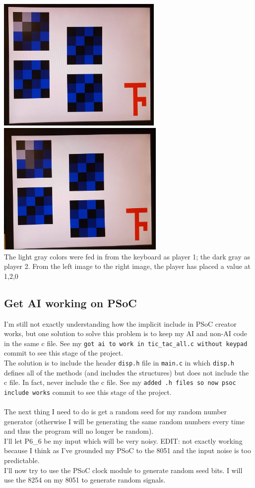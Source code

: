 \documentclass[12pt,twoside]{article}
\begin{document}
\begin{center}
\includegraphics[width = 80mm]{Pics/5-4b.jpg}
\includegraphics[width = 81mm]{Pics/5-4a.jpg}
\\ The light gray colors were fed in from the keyboard as player 1; the dark gray as player 2. From the left image to the right image, the player has placed a value at 1,2,0 \end{center}

\subsection{Get AI working on PSoC }
I'm still not exactly understanding how the implicit include in PSoC creator works, but one solution to solve this problem is to keep my AI and non-AI code in the same c file. See my \texttt{got ai to work in tic\_tac\_all.c without keypad} commit to see this stage of the project. 
\\ The solution is to include the header \texttt{disp.h} file in \texttt{main.c} in which \texttt{disp.h} defines all of the methods (and includes the structures) but does not include the c file. In fact, never include the c file.  See my \texttt{added .h files so now psoc include works} commit to see this stage of the project. 
\\
\\ The next thing I need to do is get a random seed for my random number generator (otherwise I will be generating the same random numbers every time and thus the program will no longer be random). 
\\ \indent I'll let P6\_6 be my input which will be very noisy. EDIT: not exactly working because I think as I've grounded my PSoC to the 8051 and the input noise is too predictable.
\\ \indent I'll now try to use the PSoC clock module to generate random seed bits. I will use the 8254 on my 8051 to generate random signals. 
\end{document}
